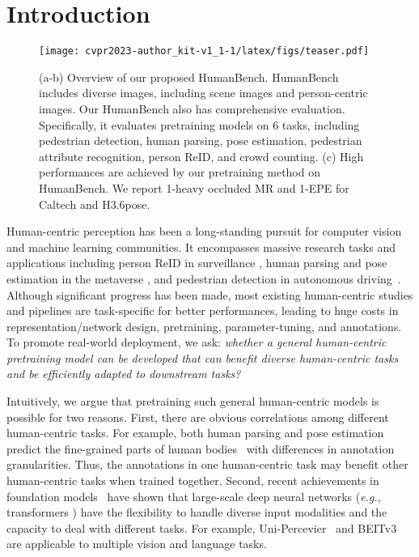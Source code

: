 \documentclass[10pt,twocolumn,letterpaper]{article}
\begin{document}
\section{Introduction}
\label{sec:intro}



\begin{figure*}[t]
    \centering
    \texttt{[image: cvpr2023-author\_kit-v1\_1-1/latex/figs/teaser.pdf]}
    \caption{(a-b) Overview of our proposed HumanBench. HumanBench includes diverse images, including scene images and person-centric images. Our HumanBench also has comprehensive evaluation. Specifically, it evaluates pretraining models on 6 tasks, including pedestrian detection, human parsing, pose estimation, pedestrian attribute recognition, person ReID, and crowd counting. (c) High performances are achieved by our pretraining method on HumanBench. We report 1-heavy occluded MR and 1-EPE for Caltech and H3.6pose.}
    \vspace{-1.5em}
    \label{fig:teaser}
\end{figure*}


Human-centric perception has been a long-standing pursuit for computer vision and machine learning communities. It encompasses massive research tasks and applications including person ReID in surveillance \cite{zheng2021online,ge2020self,luo2019bag,ge2020mutual,yu2021multiple}, human parsing and pose estimation in the metaverse \cite{xu2022vitpose, tu2020voxelpose,xiao2018simple,li2021tokenpose,li2022mvitv2,ma2017pose}, and pedestrian detection in autonomous driving~\cite{chu2020detection,lin2020detr,wang2022anchor}. 
Although significant progress has been made, most existing human-centric studies and pipelines are task-specific for better performances, leading to huge costs in representation/network design, pretraining, parameter-tuning, and annotations.
To promote real-world deployment, we ask: \emph{whether a general human-centric pretraining model can be developed that can benefit diverse human-centric tasks and be efficiently adapted to downstream tasks?}





Intuitively, we argue that pretraining such general human-centric models is possible for two reasons. First, there are obvious correlations among different human-centric tasks. For example, both human parsing and pose estimation predict the fine-grained parts of human bodies~\cite{liang2018look,hong2022versatile} with differences in annotation granularities. Thus, the annotations in one human-centric task may benefit other human-centric tasks when trained together. 
Second, recent achievements in foundation models~\cite{vaswani2017attention, devlin2018bert, radford2018improving, radford2019language, brown2020language, lepikhin2020gshard} have shown that large-scale deep neural networks (\emph{e.g.}, transformers \cite{dosovitskiy2020image}) have the flexibility to handle diverse input modalities and the capacity to deal with different tasks. For example, Uni-Percevier~\cite{zhu2022uni} and BEITv3~\cite{wang2022image} are applicable to multiple vision and language tasks.  
\end{document}
